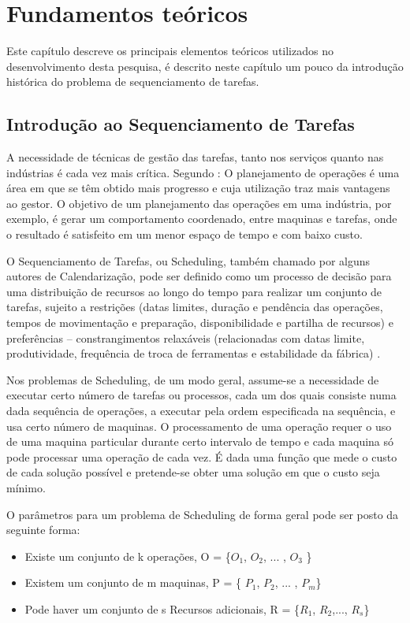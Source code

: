 \chapter{Fundamentos teóricos}\label{fundamentos}

Este capítulo descreve os principais elementos teóricos utilizados no
desenvolvimento desta pesquisa, é descrito neste capítulo um pouco da introdução histórica do problema de sequenciamento de tarefas.
\section{Introdução ao Sequenciamento de Tarefas}\label{sec:int_seq_tarefas}

A necessidade de técnicas de gestão das tarefas, tanto nos serviços quanto nas indústrias é cada vez mais crítica. Segundo : O planejamento de operações é uma área em que se têm obtido mais progresso e cuja utilização traz mais vantagens ao gestor. O objetivo de um planejamento das operações em uma indústria, por exemplo, é gerar um comportamento coordenado, entre maquinas e tarefas, onde o resultado é satisfeito em um menor espaço de tempo e com baixo custo.

O Sequenciamento de Tarefas, ou Scheduling, também chamado por alguns autores de Calendarização, pode ser definido como um processo de decisão para uma distribuição de recursos ao longo do tempo para realizar um conjunto de tarefas, sujeito a restrições (datas limites, duração e pendência das operações, tempos de movimentação e preparação, disponibilidade e partilha de recursos) e preferências – constrangimentos relaxáveis (relacionadas com datas limite, produtividade, frequência de troca de ferramentas e estabilidade da fábrica) \cite{LEPAPE}.

Nos problemas de Scheduling, de um modo geral, assume-se a necessidade de executar certo número de tarefas ou processos, cada um dos quais consiste numa dada sequência de operações, a executar pela ordem especificada na sequência, e usa certo número de maquinas. O processamento de uma operação requer o uso de uma maquina particular durante certo intervalo de tempo e cada maquina só pode processar uma operação de cada vez. É dada uma função que mede o custo de cada solução possível e pretende-se obter uma solução em que o custo seja mínimo.


O parâmetros para um problema de Scheduling de forma geral pode ser posto da seguinte forma:
\begin{itemize}
\item Existe um conjunto de k operações, O = \{$O_{1}$, $O_{2}$, ... , $O_{3}$ \}
\item Existem um conjunto de m maquinas, P = \{ $P_{1}$, $P_{2}$, ... , $P_{m}$\}
\item Pode haver um conjunto de s Recursos adicionais, R = \{$R_{1}$, $R_{2}$,..., $R_{s}$\}

\end{itemize}


